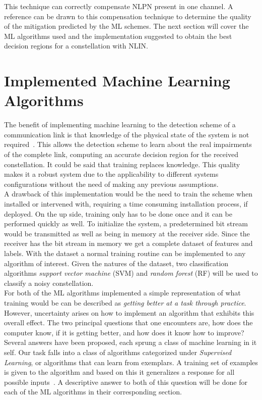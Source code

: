 This technique  can correctly compensate NLPN present in one channel. A reference can be drawn to this compensation technique to determine the quality of the mitigation predicted by the ML schemes. The next section will cover the ML algorithms used and the implementation suggested to obtain the best decision regions for a constellation with NLIN. 

\section{Implemented Machine Learning Algorithms }

The benefit of implementing machine learning to the detection scheme of a communication link is that knowledge of the physical state of the system is not required~\cite{zibar2015application}. This allows the detection scheme to learn about the real impairments of the complete link, computing an accurate decision region for the received constellation. It could be said that training replaces knowledge. This quality makes it a robust system due to the applicability to different systems configurations without the need of making any previous assumptions.~\\

 A drawback of this implementation would be the need to train the scheme when installed or intervened with, requiring a time consuming installation process, if deployed. On the up side, training only has to be done once and it can be performed quickly as well. To initialize the system, a predetermined bit stream would be transmitted as well as being in memory at the receiver side. Since the receiver has the bit stream in memory we get a complete dataset of features and labels. With the dataset a normal training routine can be implemented to any algorithm of interest. Given the natures of the dataset, two classification algorithms \textit{support vector machine} (SVM) and \textit{random forest} (RF) will be used to classify a noisy constellation.~\\  


For both of the ML algorithms implemented a simple representation of what training would be can be described as \emph{getting better at a task through practice}. However, uncertainty arises on how to implement an algorithm that exhibits this overall effect. The two principal questions that one encounters are, how does the computer know, if it is getting better, and how does it know how to improve?  Several answers have been proposed, each sprung a class of machine learning in it self. Our task falls into a class of algorithms categorized under \textit{Supervised Learning}, or algorithms that can learn from exemplars. A training set of examples is given to the algorithm and based on this it generalizes a response for all possible inputs~\cite{marsland2014machine}. A descriptive answer to both of this question will be done for each of the ML algorithms in their corresponding section.




